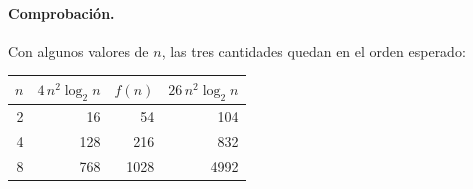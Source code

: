 \noindent\begin{minipage}{\linewidth}
\paragraph{Comprobación.}
Con algunos valores de $n$, las tres cantidades quedan en el orden esperado:
\begin{center}
\begin{tabular}{rrrr}
  \toprule
  $n$ & $4\, n^2 \log_2 n$ & $f(n)$ & $26\, n^2 \log_2 n$ \\
  \midrule
  2 & 16  & 54   & 104  \\
  4 & 128 & 216  & 832  \\
  8 & 768 & 1028 & 4992 \\
  \bottomrule
\end{tabular}
\end{center}
\end{minipage}

